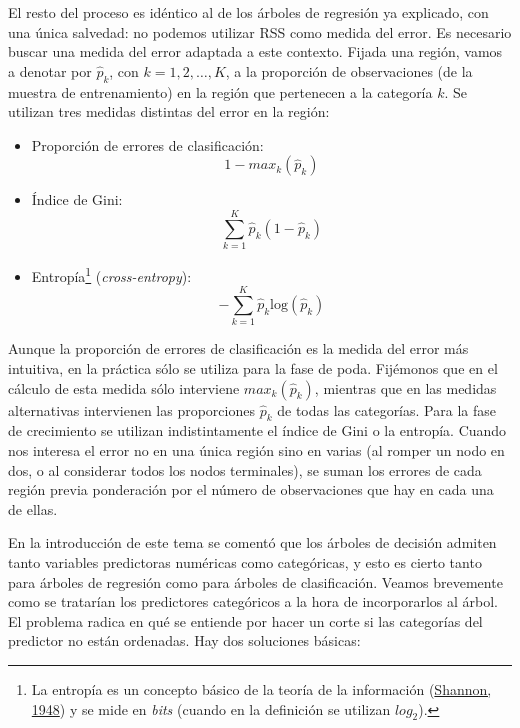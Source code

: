 \documentclass[
  spanish,
]{book}
\theoremstyle{break}
\theoremstyle{definition}
\theoremstyle{definition}
\theoremstyle{definition}
\theoremstyle{definition}
\theoremstyle{remark}
\begin{document}
El resto del proceso es idéntico al de los árboles de regresión ya explicado,
con una única salvedad: no podemos utilizar RSS como medida del error. Es
necesario buscar una medida del error adaptada a este contexto.
Fijada una región, vamos a denotar por
\(\widehat p_{k}\), con \(k = 1, 2, \ldots, K\), a la proporción de observaciones
(de la muestra de entrenamiento) en la región que pertenecen a la categoría \(k\).
Se utilizan tres medidas distintas del error en la región:

\begin{itemize}
\item
  Proporción de errores de clasificación:
  \[1 - max_{k} (\widehat p_{k})\]
\item
  Índice de Gini:
  \[\sum_{k=1}^K \widehat p_{k} (1 - \widehat p_{k})\]
\item
  Entropía\footnote{La entropía es un concepto básico de la teoría de la información (\protect\hyperlink{ref-shannon1948mathematical}{Shannon, 1948}) y se mide en \emph{bits} (cuando en la definición se utilizan \(log_2\)).} (\emph{cross-entropy}):
  \[- \sum_{k=1}^K \widehat p_{k} \text{log}(\widehat p_{k})\]
\end{itemize}

Aunque la proporción de errores de clasificación es la medida del error más intuitiva, en la práctica sólo se utiliza para la fase de poda. Fijémonos que en el cálculo de esta medida sólo interviene \(max_{k} (\widehat p_{k})\), mientras que en las medidas alternativas intervienen las proporciones \(\widehat p_{k}\) de todas las categorías. Para la fase de crecimiento se utilizan indistintamente el índice de Gini o la entropía. Cuando nos interesa el error no en una única región sino en varias (al romper un nodo en dos, o al considerar todos los nodos terminales), se suman los errores de cada región previa ponderación por el número de observaciones que hay en cada una de ellas.

En la introducción de este tema se comentó que los árboles de decisión admiten tanto variables predictoras numéricas como categóricas, y esto es cierto tanto para árboles de regresión como para árboles de clasificación. Veamos brevemente como se tratarían los predictores categóricos a la hora de incorporarlos al árbol. El problema radica en qué se entiende por hacer un corte si las categorías del predictor no están ordenadas. Hay dos soluciones básicas:
\end{document}
